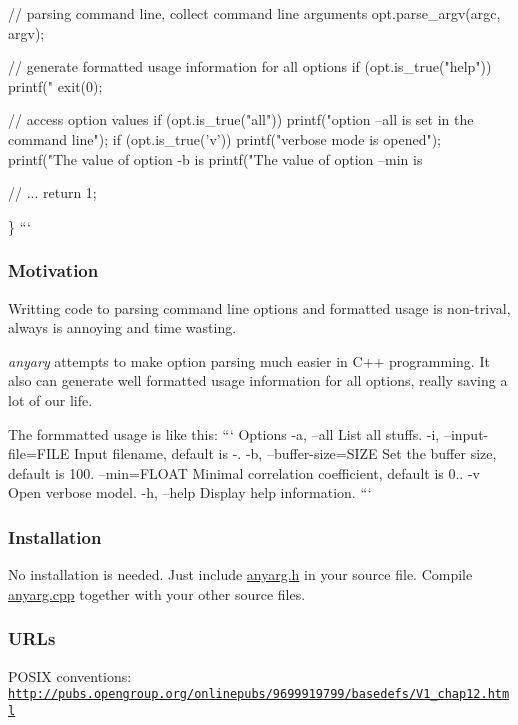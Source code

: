 \begin{DoxyVerb}// parsing command line, collect command line arguments
opt.parse_argv(argc, argv);

// generate formatted usage information for all options
if (opt.is_true("help")) {
    printf("%
    exit(0);
}

// access option values
if (opt.is_true("all"))
    printf("option --all is set in the command line\n");
if (opt.is_true('v'))
    printf("verbose mode is opened\n");
printf("The value of option -b is %
printf("The value of option --min is %

// ...
return 1;
\end{DoxyVerb}
 \} ```

\subsubsection*{Motivation}

Writting code to parsing command line options and formatted usage is non-\/trival, always is annoying and time wasting.

{\itshape anyary} attempts to make option parsing much easier in C++ programming. It also can generate well formatted usage information for all options, really saving a lot of our life.

The formmatted usage is like this\+: ``` Options -\/a, --all List all stuffs. -\/i, --input-\/file=F\+I\+L\+E Input filename, default is -\/. -\/b, --buffer-\/size=S\+I\+Z\+E Set the buffer size, default is 100. --min=F\+L\+O\+A\+T Minimal correlation coefficient, default is 0.. -\/v Open verbose model. -\/h, --help Display help information. ```

\subsubsection*{Installation}

No installation is needed. Just include \hyperlink{anyarg_8h}{anyarg.\+h} in your source file. Compile \hyperlink{anyarg_8cpp}{anyarg.\+cpp} together with your other source files.

\subsubsection*{U\+R\+Ls}

P\+O\+S\+I\+X conventions\+: \href{http://pubs.opengroup.org/onlinepubs/9699919799/basedefs/V1_chap12.html}{\tt http\+://pubs.\+opengroup.\+org/onlinepubs/9699919799/basedefs/\+V1\+\_\+chap12.\+html}

